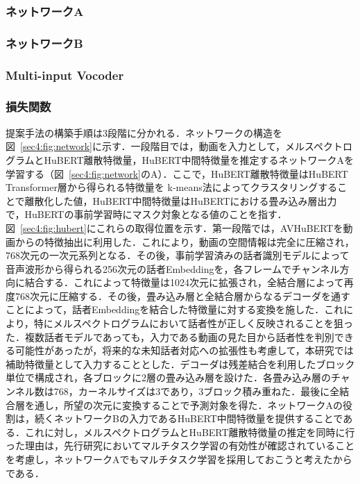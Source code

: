 \documentclass[12pt]{jarticle}
\numberwithin{equation}{section}    %
\numberwithin{figure}{section}      %
\numberwithin{table}{section}      %
\begin{document}
\subsubsection{ネットワークA}
\subsubsection{ネットワークB}
\subsubsection{Multi-input Vocoder}
\subsubsection{損失関数}

提案手法の構築手順は3段階に分かれる．ネットワークの構造を図~\ref{sec4:fig:network}に示す．一段階目では，動画を入力として，メルスペクトログラムとHuBERT離散特徴量，HuBERT中間特徴量を推定するネットワークAを学習する（図~\ref{sec4:fig:network}のA）．ここで，HuBERT離散特徴量はHuBERT Transformer層から得られる特徴量を k-means法によってクラスタリングすることで離散化した値，HuBERT中間特徴量はHuBERTにおける畳み込み層出力で，HuBERTの事前学習時にマスク対象となる値のことを指す．図~\ref{sec4:fig:hubert}にこれらの取得位置を示す．第一段階では，AVHuBERTを動画からの特徴抽出に利用した．これにより，動画の空間情報は完全に圧縮され，768次元の一次元系列となる．その後，事前学習済みの話者識別モデル\cite{wan2018generalized}によって音声波形から得られる256次元の話者Embeddingを，各フレームでチャンネル方向に結合する．これによって特徴量は1024次元に拡張され，全結合層によって再度768次元に圧縮する．その後，畳み込み層と全結合層からなるデコーダを通すことによって，話者Embeddingを結合した特徴量に対する変換を施した．これにより，特にメルスペクトログラムにおいて話者性が正しく反映されることを狙った．複数話者モデルであっても，入力である動画の見た目から話者性を判別できる可能性があったが，将来的な未知話者対応への拡張性も考慮して，本研究では補助特徴量として入力することとした．デコーダは残差結合を利用したブロック単位で構成され，各ブロックに2層の畳み込み層を設けた．各畳み込み層のチャンネル数は768，カーネルサイズは3であり，3ブロック積み重ねた．最後に全結合層を通し，所望の次元に変換することで予測対象を得た．ネットワークAの役割は，続くネットワークBの入力であるHuBERT中間特徴量を提供することである．これに対し，メルスペクトログラムとHuBERT離散特徴量の推定を同時に行った理由は，先行研究においてマルチタスク学習の有効性が確認されていることを考慮し，ネットワークAでもマルチタスク学習を採用しておこうと考えたからである．
\end{document}
